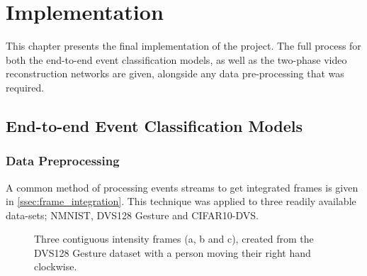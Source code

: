 \chapter{Implementation} \label{chap:implementation}

This chapter presents the final implementation of the project. The full process for both the end-to-end event classification models, as well as the two-phase video reconstruction networks are given, alongside any data pre-processing that was required.

\section{End-to-end Event Classification Models}

\subsection{Data Preprocessing}

A common method of processing events streams to get integrated frames is given in \cref{ssec:frame_integration}. This technique was applied to three readily available data-sets; NMNIST, DVS128 Gesture and CIFAR10-DVS.

\begin{figure}[htb]%
    \centering
    \qquad
    \qquad
    \caption{Three contiguous intensity frames ({a}, {b} and {c}), created from the DVS128 Gesture dataset with a person moving their right hand clockwise.}%
    \label{fig:dvs128_integrated_frames}%
\end{figure}

